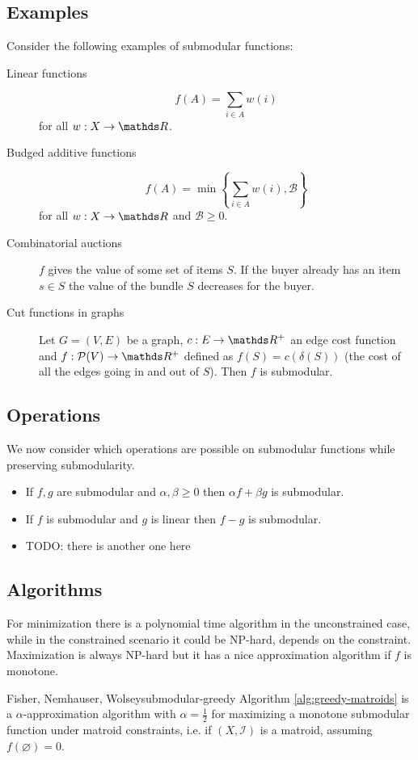 \documentclass[12pt]{extarticle}
\begin{document}
\subsection{Examples}
Consider the following examples of submodular functions:
\begin{description}
	\item[Linear functions]
	      \begin{equation}
		      f(A) = \sum_{i \in A} w(i)
	      \end{equation}
	      for all $w: X \to \R$.
	\item[Budged additive functions]
	      \begin{equation}
		      f(A) = \min \left\{\sum_{i \in A} w(i), \mathcal B \right\}
	      \end{equation}
	      for all $w: X \to \R$ and $\mathcal B \geq 0$.
	\item[Combinatorial auctions] $f$ gives the value of some set of items $S$. If the buyer already
	      has an item $s \in S$ the value of the bundle $S$ decreases for the buyer.

	\item[Cut functions in graphs] Let $G = (V, E)$ be a graph, $c: E \to \R^+$ an edge cost function
	      and $f: \mathcal P(V) \to \R^+$ defined as $f(S) = c(\delta(S))$ (the cost of all the edges
	      going in and out of $S$). Then $f$ is submodular.
\end{description}

\subsection{Operations}

We now consider which operations are possible on submodular functions while preserving
submodularity.
\begin{itemize}
	\item If $f, g$ are submodular and $\alpha, \beta \geq 0$ then $\alpha f + \beta g$ is submodular.
	\item If $f$ is submodular and $g$ is linear then $f - g$ is submodular.
	\item TODO: there is another one here
\end{itemize}

\subsection{Algorithms}

For minimization there is a polynomial time algorithm in the unconstrained case, while in the
constrained scenario it could be NP-hard, depends on the constraint.
Maximization is always NP-hard but it has a nice approximation algorithm if $f$ is monotone.

\begin{theorem}{Fisher, Nemhauser, Wolsey}{submodular-greedy}
	Algorithm \ref{alg:greedy-matroids} is a $\alpha$-approximation algorithm with
	$\alpha = \frac{1}{2}$ for maximizing a monotone submodular function under matroid constraints,
	i.e. if $(X, \mathcal I)$ is a matroid, assuming $f(\varnothing) = 0$.
\end{theorem}
\end{document}
